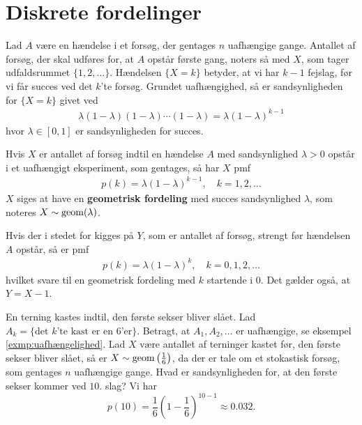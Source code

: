 \section{Diskrete fordelinger}
Lad $A$ være en hændelse i et forsøg, der gentages $n$ uafhængige gange. Antallet af forsøg, der skal udføres for, at $A$ opstår første gang, noters så med $X$, som tager udfaldsrummet $\{1,2,\ldots\}$. Hændelsen $\{X=k\}$ betyder, at vi har $k-1$ fejslag, før vi får succes ved det $k$'te forsøg. Grundet uafhængighed, så er sandsynligheden for $\{X=k\}$ givet ved
\begin{align*}
    \lambda(1-\lambda)(1-\lambda)\cdots (1-\lambda) =\lambda(1-\lambda)^{k-1}
\end{align*}
hvor $\lambda \in [0, 1]$ er sandsynligheden for succes.
\begin{defn} \label{def:2.14} %
Hvis $X$ er antallet af forsøg indtil en hændelse $A$ med sandsynlighed $\lambda>0$ opstår i et uafhængigt eksperiment, som gentages, så har $X$ pmf 
\begin{align*}
    p(k)=\lambda(1-\lambda)^{k-1}, \quad k=1,2,\ldots 
\end{align*}
$X$ siges at have en \textbf{geometrisk fordeling} med succes sandsynlighed $\lambda$, som noteres $X\sim\textnormal{geom}(\lambda)$.
\end{defn}

Hvis der i stedet for kigges på $Y$, som er antallet af forsøg, strengt før hændelsen $A$ opstår, så er pmf
\begin{align*}
    p(k)=\lambda(1-\lambda)^{k}, \quad k=0,1,2,\ldots 
\end{align*}
hvilket svare til en geometrisk fordeling med $k$ startende i $0$. Det gælder også, at $Y=X-1$.

\begin{exmp}
En terning kastes indtil, den første sekser bliver slået. Lad $A_k = \{\text{det } k \text{'te kast er en 6'er}\}$. Betragt, at $A_1, A_2, \ldots$ er uafhængige, se eksempel \ref{exmp:uafhængelighed}. Lad $X$ være antallet af terninger kastet før, den første sekser bliver slået, så er $X \sim \textnormal{geom}\left(\tfrac{1}{6}\right)$, da der er tale om et stokastisk forsøg, som gentages $n$ uafhængige gange. Hvad er sandsynligheden for, at den første sekser kommer ved $10.$ slag? Vi har 
\begin{equation*}
    p(10) = \frac{1}{6} \left(1-\frac{1}{6}\right)^{10 - 1} \approx 0.032.
\end{equation*}
\end{exmp}


